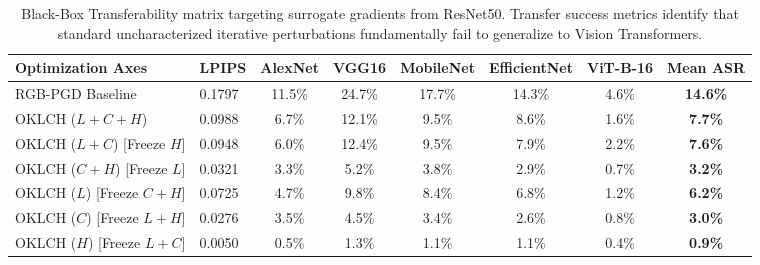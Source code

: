 \begin{table}[htbp]
\centering
\small
\caption{Black-Box Transferability matrix targeting surrogate gradients from ResNet50. Transfer success metrics identify that standard uncharacterized iterative perturbations fundamentally fail to generalize to Vision Transformers.}
\label{tab:transferability_matrix}
\begin{adjustbox}{max width=\linewidth}
\begin{tabular}{@{}llcccccc@{}}
\toprule
\textbf{Optimization Axes} & \textbf{LPIPS} & \textbf{AlexNet} & \textbf{VGG16} & \textbf{MobileNet} & \textbf{EfficientNet} & \textbf{ViT-B-16} & \textbf{Mean ASR} \\ \midrule
RGB-PGD Baseline & 0.1797 & 11.5\% & 24.7\% & 17.7\% & 14.3\% & 4.6\% & \textbf{14.6\%} \\
OKLCH ($L+C+H$) & 0.0988 & 6.7\% & 12.1\% & 9.5\% & 8.6\% & 1.6\% & \textbf{7.7\%} \\
OKLCH ($L+C$) [Freeze $H$] & 0.0948 & 6.0\% & 12.4\% & 9.5\% & 7.9\% & 2.2\% & \textbf{7.6\%} \\
OKLCH ($C+H$) [Freeze $L$] & 0.0321 & 3.3\% & 5.2\% & 3.8\% & 2.9\% & 0.7\% & \textbf{3.2\%} \\
OKLCH ($L$) [Freeze $C+H$] & 0.0725 & 4.7\% & 9.8\% & 8.4\% & 6.8\% & 1.2\% & \textbf{6.2\%} \\
OKLCH ($C$) [Freeze $L+H$] & 0.0276 & 3.5\% & 4.5\% & 3.4\% & 2.6\% & 0.8\% & \textbf{3.0\%} \\
OKLCH ($H$) [Freeze $L+C$] & 0.0050 & 0.5\% & 1.3\% & 1.1\% & 1.1\% & 0.4\% & \textbf{0.9\%} \\
\bottomrule
\end{tabular}
\end{adjustbox}
\end{table}
